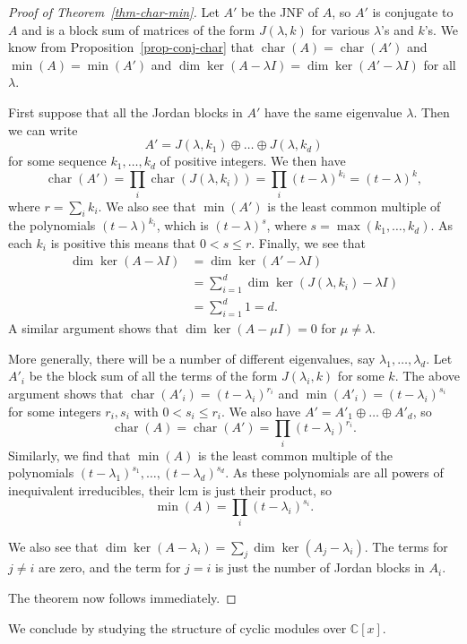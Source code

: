 \documentclass{amsart}
\newcommand{\chr}       {\operatorname{char}}
\newcommand{\C}         {{\mathbb{C}}}
\newcommand{\lm}        {\lambda}
\newcommand{\op}        {\oplus}
\renewcommand{\:}{\colon}
\theoremstyle{definition}
\begin{document}
\begin{proof}[Proof of Theorem~\ref{thm-char-min}]
 Let $A'$ be the JNF of $A$, so $A'$ is conjugate to $A$ and is a
 block sum of matrices of the form $J(\lm,k)$ for various $\lm$'s and
 $k$'s.  We know from Proposition~\ref{prop-conj-char} that
 $\chr(A)=\chr(A')$ and $\min(A)=\min(A')$ and
 $\dim\ker(A-\lm I)=\dim\ker(A'-\lm I)$ for all $\lm$.

 First suppose that all the Jordan blocks in $A'$ have the same
 eigenvalue $\lm$.  Then we can write
 \[ A' = J(\lm,k_1) \op \ldots \op J(\lm,k_d) \]
 for some sequence $k_1,\ldots,k_d$ of positive integers.  We then
 have
 \[ \chr(A')=\prod_i\chr(J(\lm,k_i))=\prod_i(t-\lm)^{k_i}
     = (t-\lm)^k, 
 \]
 where $r=\sum_ik_i$.  We also see that $\min(A')$ is the least common
 multiple of the polynomials $(t-\lm)^{k_i}$, which is $(t-\lm)^s$,
 where $s=\max(k_1,\ldots,k_d)$.  As each $k_i$ is positive this means
 that $0<s\leq r$.  Finally, we see that 
 \begin{align*}
  \dim\ker(A-\lm I) &= \dim\ker(A'-\lm I) \\
   &= \sum_{i=1}^d \dim\ker(J(\lm,k_i)-\lm I) \\
   &= \sum_{i=1}^d 1 = d.
 \end{align*}
 A similar argument shows that $\dim\ker(A-\mu I)=0$ for $\mu\neq\lm$.
 
 More generally, there will be a number of different eigenvalues, say
 $\lm_1,\ldots,\lm_d$.  Let $A'_i$ be the block sum of all the terms
 of the form $J(\lm_i,k)$ for some $k$.  The above argument shows that
 $\chr(A'_i)=(t-\lm_i)^{r_i}$ and $\min(A'_i)=(t-\lm_i)^{s_i}$ for
 some integers $r_i,s_i$ with $0<s_i\leq r_i$.  We also have
 $A'=A'_1\op\ldots\op A'_d$, so 
 \[ \chr(A)=\chr(A')=\prod_i(t-\lm_i)^{r_i}. \]
 Similarly, we find that $\min(A)$ is the least common multiple of the
 polynomials $(t-\lm_1)^{s_1},\ldots,(t-\lm_d)^{s_d}$.  As these
 polynomials are all powers of inequivalent irreducibles, their lcm is
 just their product, so 
 \[ \min(A) = \prod_i (t-\lm_i)^{s_i}. \]

 We also see that $\dim\ker(A-\lm_i)=\sum_j\dim\ker(A_j-\lm_i)$.  The
 terms for $j\neq i$ are zero, and the term for $j=i$ is just the
 number of Jordan blocks in $A_i$.

 The theorem now follows immediately.
\end{proof}

We conclude by studying the structure of cyclic modules over $\C[x]$.
\end{document}
